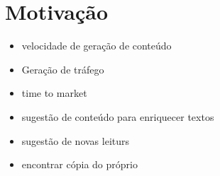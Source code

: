 \section{Motivação}

\begin{itemize}
    \item velocidade de geração de conteúdo
    \item Geração de tráfego
    \item time to market
    \item sugestão de conteúdo para enriquecer textos
    \item sugestão de novas leiturs
    \item encontrar cópia do próprio
\end{itemize}
